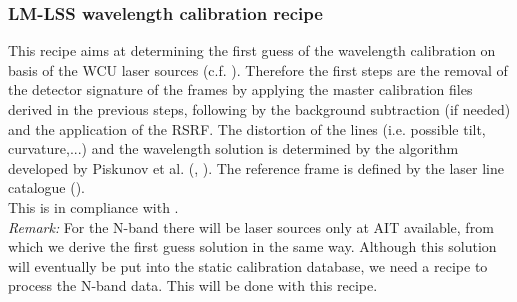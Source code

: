 \clearpage
\subsubsection{LM-LSS wavelength calibration recipe }\label{rec:metis_lm_lss_wave}
This recipe aims at determining the first guess of the wavelength calibration on basis of the \ac{WCU} laser sources (c.f. \cite{METIS-calibration_plan}). Therefore the first steps are the removal of the detector signature of the  frames by applying the master calibration files derived in the previous steps, following by the background subtraction (if needed) and the application of the RSRF. The distortion of the lines (i.e. possible tilt, curvature,...) and the wavelength solution is determined by the algorithm developed by Piskunov et al. (\cite{pis02}, \cite{pis21}). The reference frame is defined by the laser line catalogue (\hyperref[dataitem:laser_tab]{}).\\
This is in compliance with .\\
\textit{Remark:}  For the N-band there will be laser sources only at \ac{AIT} available, from which we derive the first guess solution in the same way. Although this solution will eventually be put into the static calibration database, we need a recipe to process the N-band data. This will be done with this recipe.

